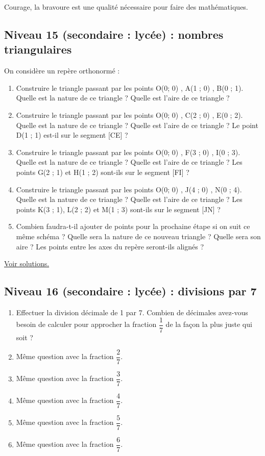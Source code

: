 \documentclass[11pt]{article}
\begin{document}
Courage, la bravoure est une qualité nécessaire pour faire des
mathématiques.


\newpage

\subsection{Niveau 15 (secondaire : lycée) : nombres triangulaires}
\label{sec:org9ec79e5}

\label{org6596a55}

On considère un repère orthonormé :


\begin{enumerate}
\item Construire le triangle passant par les points O(0; 0) , A(1 ; 0) ,
B(0 ; 1). Quelle est la nature de ce triangle ? Quelle est l'aire
de ce triangle ?
\item Construire le triangle passant par les points O(0; 0) , C(2 ; 0) ,
E(0 ; 2). Quelle est la nature de ce triangle ? Quelle est l'aire
de ce triangle ? Le point D(1 ; 1) est-il sur le segment [CE] ?
\item Construire le triangle passant par les points O(0; 0) , F(3 ; 0) ,
I(0 ; 3). Quelle est la nature de ce triangle ? Quelle est l'aire
de ce triangle ? Les points G(2 ; 1) et H(1 ; 2) sont-ils sur le
segment [FI] ?
\item Construire le triangle passant par les points O(0; 0) , J(4 ; 0) ,
N(0 ; 4). Quelle est la nature de ce triangle ? Quelle est l'aire
de ce triangle ? Les points K(3 ; 1), L(2 ; 2) et M(1 ; 3) sont-ils
sur le segment [JN] ?
\item Combien faudra-t-il ajouter de points pour la prochaine étape si on
suit ce même schéma ? Quelle sera la nature de ce nouveau triangle
? Quelle sera son aire ? Les points entre les axes du repère
seront-ils alignés ?
\end{enumerate}



\hyperref[org51d2e3e]{Voir solutions.}

\newpage

\subsection{Niveau 16 (secondaire : lycée) : divisions par 7}
\label{sec:org56e906f}

\label{orgd4d3fd8}


\begin{enumerate}
\item Effectuer la division décimale de 1 par 7. Combien de décimales
avez-vous besoin de calculer pour approcher la fraction
\(\dfrac{1}{7}\) de la façon la plus juste qui soit ?
\item Même question avec la fraction \(\dfrac{2}{7}\).
\item Même question avec la fraction \(\dfrac{3}{7}\).
\item Même question avec la fraction \(\dfrac{4}{7}\).
\item Même question avec la fraction \(\dfrac{5}{7}\).
\item Même question avec la fraction \(\dfrac{6}{7}\).
\end{enumerate}
\end{document}
